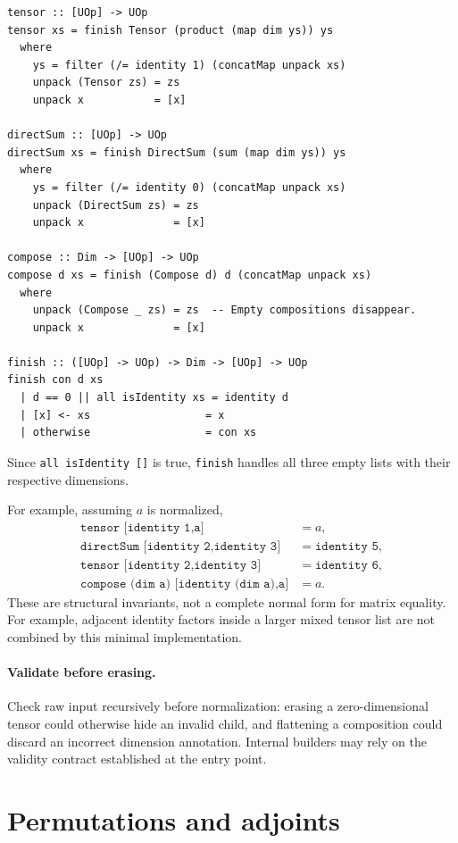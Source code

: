 \documentclass[11pt,a4paper]{article}
\newcommand{\code}[1]{\texttt{#1}}
\begin{document}
\begin{lstlisting}
tensor :: [UOp] -> UOp
tensor xs = finish Tensor (product (map dim ys)) ys
  where
    ys = filter (/= identity 1) (concatMap unpack xs)
    unpack (Tensor zs) = zs
    unpack x           = [x]

directSum :: [UOp] -> UOp
directSum xs = finish DirectSum (sum (map dim ys)) ys
  where
    ys = filter (/= identity 0) (concatMap unpack xs)
    unpack (DirectSum zs) = zs
    unpack x              = [x]

compose :: Dim -> [UOp] -> UOp
compose d xs = finish (Compose d) d (concatMap unpack xs)
  where
    unpack (Compose _ zs) = zs  -- Empty compositions disappear.
    unpack x              = [x]

finish :: ([UOp] -> UOp) -> Dim -> [UOp] -> UOp
finish con d xs
  | d == 0 || all isIdentity xs = identity d
  | [x] <- xs                  = x
  | otherwise                  = con xs
\end{lstlisting}

Since \code{all isIdentity []} is true, \code{finish} handles all
three empty lists with their respective dimensions.

For example, assuming $a$ is normalized,
\[
\begin{aligned}
 \code{tensor [identity 1,a]}&=a,\\
 \code{directSum [identity 2,identity 3]}&=\code{identity 5},\\
 \code{tensor [identity 2,identity 3]}&=\code{identity 6},\\
 \code{compose (dim a) [identity (dim a),a]}&=a.
\end{aligned}
\]
These are structural invariants, not a complete normal form for matrix
equality. For example, adjacent identity factors inside a larger mixed
tensor list are not combined by this minimal implementation.

\paragraph{Validate before erasing.}
Check raw input recursively before normalization: erasing a zero-dimensional
tensor could otherwise hide an invalid child, and flattening a composition
could discard an incorrect dimension annotation. Internal builders may
rely on the validity contract established at the entry point.

\section{Permutations and adjoints}
\end{document}
